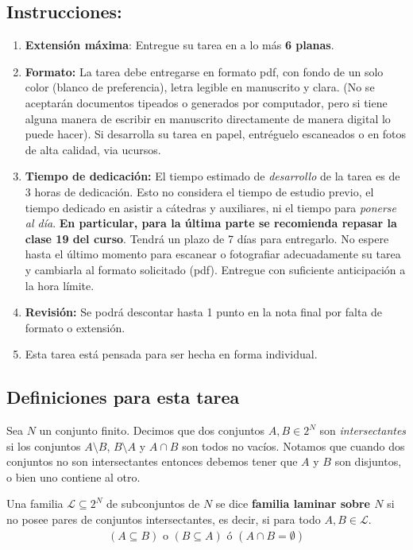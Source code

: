 \documentclass{article}
\theoremstyle{plain}
\theoremstyle{definition}
\theoremstyle{Azul}
\begin{document}
\subsection*{Instrucciones:} 
\begin{enumerate}
\item \textbf{Extensión máxima}: Entregue su tarea en a lo más \textbf{6 planas}.
    \item \textbf{Formato:} La tarea debe entregarse en formato pdf, con fondo de un solo color (blanco de preferencia), letra legible en manuscrito y clara. (No se aceptarán documentos tipeados o generados por computador, pero si tiene alguna manera de escribir en manuscrito directamente de manera digital lo puede hacer).
    Si desarrolla su tarea en papel, entréguelo escaneados o en fotos de alta calidad, via ucursos.    \item \textbf{Tiempo de dedicación:} El tiempo estimado de \emph{desarrollo} de la tarea es de 3 horas de dedicación. Esto no considera el tiempo de estudio previo, el tiempo dedicado en asistir a cátedras y auxiliares, ni el tiempo para \emph{ponerse al día}. \textbf{En particular, para la última parte se recomienda repasar la clase 19 del curso}.
     Tendrá un plazo de 7 días para entregarlo. No espere hasta el último momento para escanear o fotografiar adecuadamente su tarea y cambiarla al formato solicitado (pdf). Entregue con suficiente anticipación a la hora límite.
    \item \textbf{Revisión:} Se podrá descontar hasta 1 punto en la nota final por falta de formato o extensión.
\item Esta tarea está pensada para ser hecha en forma individual.
    \end{enumerate}
    
  \subsection*{Definiciones para esta tarea}
Sea $N$ un conjunto finito. Decimos que dos conjuntos $A, B \in 2^N$ son \emph{intersectantes} si los conjuntos $A\setminus B$, $B\setminus A$ y $A\cap B$ son todos no vacíos. Notamos que cuando dos conjuntos no son intersectantes entonces debemos tener que $A$ y $B$ son disjuntos, o bien uno contiene al otro.

Una familia $\mathcal{L}\subseteq 2^N$ de subconjuntos de $N$ se dice \textbf{familia laminar sobre $N$} si no posee pares de conjuntos intersectantes, es decir, si para todo $A, B\in \mathcal{L}$.
\begin{align*}
(A\subseteq B) \text{ o } (B\subseteq A) \text{ ó } 
(A\cap B = \emptyset)
\end{align*}
\end{document}
